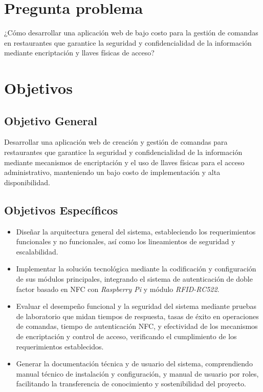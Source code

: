\section{Pregunta problema}

¿Cómo desarrollar una aplicación web de bajo costo para la gestión de comandas en restaurantes que garantice la seguridad y confidencialidad de la información mediante encriptación y llaves físicas de acceso?

\section{Objetivos}

\subsection{Objetivo General}
Desarrollar una aplicación web de creación y gestión de comandas para restaurantes que garantice la seguridad y confidencialidad de la información mediante mecanismos de encriptación y el uso de llaves físicas para el acceso administrativo, manteniendo un bajo costo de implementación y alta disponibilidad.

\subsection{Objetivos Específicos}
\begin{itemize}
	\item Diseñar la arquitectura general del sistema, estableciendo los requerimientos funcionales y no funcionales, así como los lineamientos de seguridad y escalabilidad.
	
	\item Implementar la solución tecnológica mediante la codificación y configuración de sus módulos principales, integrando el sistema de autenticación de doble factor basado en NFC con \textit{Raspberry Pi} y módulo \textit{RFID-RC522}.
	
	\item Evaluar el desempeño funcional y la seguridad del sistema mediante pruebas de laboratorio que midan tiempos de respuesta, tasas de éxito en operaciones de comandas, tiempo de autenticación NFC, y efectividad de los mecanismos de encriptación y control de acceso, verificando el cumplimiento de los requerimientos establecidos.
	
	\item Generar la documentación técnica y de usuario del sistema, comprendiendo manual técnico de instalación y configuración, y manual de usuario por roles, facilitando la transferencia de conocimiento y sostenibilidad del proyecto.
\end{itemize}



